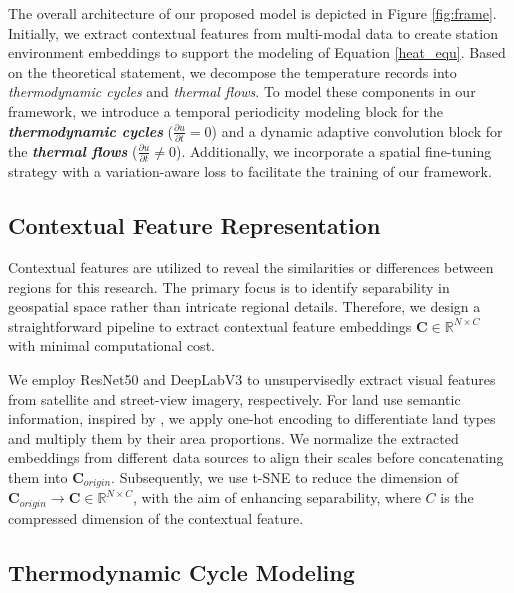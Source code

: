  The overall architecture of our proposed model is depicted in Figure \ref{fig:frame}. Initially, we extract contextual features from multi-modal data to create station environment embeddings to support the modeling of Equation \ref{heat_equ}. Based on the theoretical statement, we decompose the temperature records into \textit{thermodynamic cycles} and \textit{thermal flows}. To model these components in our framework, we introduce a temporal periodicity modeling block for the \textit{\textbf{thermodynamic cycles}} ($\frac{\partial u}{\partial t}=0$) and a dynamic adaptive convolution block for the \textit{\textbf{thermal flows}} ($\frac{\partial u}{\partial t}\neq 0$). Additionally, we incorporate a spatial fine-tuning strategy with a variation-aware loss to facilitate the training of our framework.


\subsection{Contextual Feature Representation}
Contextual features are utilized to reveal the similarities or differences between regions for this research. The primary focus is to identify separability in geospatial space rather than intricate regional details. Therefore, we design a straightforward pipeline to extract contextual feature embeddings $\mathbf{C} \in \mathbb{R}^{N \times C}$ with minimal computational cost.

We employ ResNet50 and DeepLabV3 to unsupervisedly extract visual features from satellite and street-view imagery, respectively. For land use semantic information, inspired by \cite{zou2024learning}, we apply one-hot encoding to differentiate land types and multiply them by their area proportions. We normalize the extracted embeddings from different data sources to align their scales before concatenating them into $\mathbf{C_{\textit{origin}}}$. Subsequently, we use t-SNE to reduce the dimension of $\mathbf{C_{\textit{origin}}}\rightarrow\mathbf{C}\in \mathbb{R}^{N \times C}$, with the aim of enhancing separability, where $C$ is the compressed dimension of the contextual feature.

\subsection{Thermodynamic Cycle Modeling}
